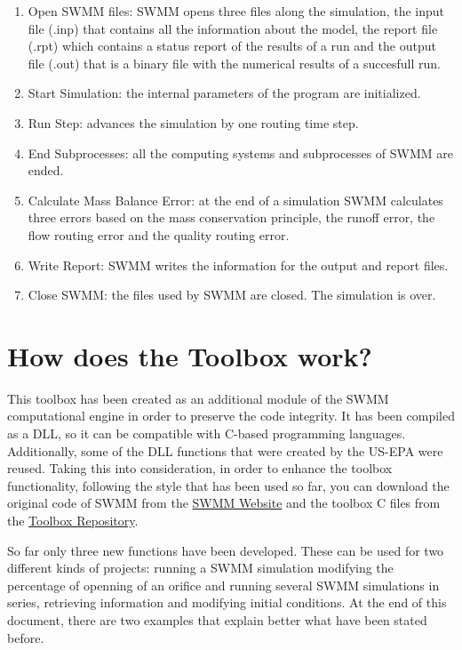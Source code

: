\documentclass[11pt, letterpaper]{article}
\begin{document}
\begin{enumerate}
	\item Open SWMM files: SWMM opens three files along the simulation, the input file (.inp) that contains all the information about the model, the report file (.rpt) which contains a status report of the results of a run and the output file (.out) that is a binary file with the numerical results of a succesfull run.
	\item Start Simulation: the internal parameters of the program are initialized.
	\item Run Step: advances the simulation by one routing time step.
	\item End Subprocesses: all the computing systems and subprocesses of SWMM are ended.
	\item Calculate Mass Balance Error: at the end of a simulation SWMM calculates three errors based on the mass conservation principle, the runoff error, the flow routing error and the quality routing error.
	\item Write Report: SWMM writes the information for the output and report files.
	\item Close SWMM: the files used by SWMM are closed. The simulation is over.
\end{enumerate}


\section{How does the Toolbox work?}

This toolbox has been created as an additional module of the SWMM computational engine in order to preserve the code integrity. It has been compiled as a DLL, so it can be compatible with C-based programming languages. Additionally, some of the DLL functions that were created by the US-EPA were reused. Taking this into consideration, in order to enhance the toolbox functionality, following the style that has been used so far, you can download the original code of SWMM from the \textcolor{blue}{\href{http://www.epa.gov/nrmrl/wswrd/wq/models/swmm/}{SWMM Website}} and the toolbox C files from the \textcolor{blue}{\href{https://bitbucket.org/swmmtoolbox001}{Toolbox Repository}}.

\setlength\parindent{12pt}
So far only three new functions have been developed. These can be used for two different kinds of projects: running a SWMM simulation modifying the percentage of openning of an orifice and running several SWMM simulations in series, retrieving information and modifying initial conditions. At the end of this document, there are two examples that explain better what have been stated before.
\end{document}
